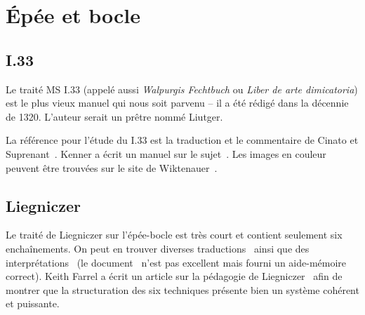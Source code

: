 \chapter{Épée et bocle}

\section{I.33}

Le traité MS I.33 (appelé aussi \emph{Walpurgis Fechtbuch} ou \emph{Liber de arte dimicatoria}) est le plus vieux manuel qui nous soit parvenu – il a été rédigé dans la décennie de 1320.
L'auteur serait un prêtre nommé Liutger.

La référence pour l'étude du I.33 est la traduction et le commentaire de Cinato et Suprenant~\cite{cinato:I33:2009}.
Kenner a écrit un manuel sur le sujet~\cite{kenner:I33:2014}.
Les images en couleur peuvent être trouvées sur le site de Wiktenauer~\cite{wiktenauer:I33}.


\section{Liegniczer}

Le traité de Liegniczer sur l'épée-bocle est très court et contient seulement six enchaînements.
On peut en trouver diverses traductions~\cite{ardamhe:liegniczer, farrell:liegnieczer, lindholm:ringeck_others:2006} ainsi que des interprétations~\cite{youtube:sala_armi:liegniczer, youtube:memag:liegniczer} (le document~\cite[part I]{knight:epee_bocle} n'est pas excellent mais fourni un aide-mémoire correct).
Keith Farrel a écrit un article sur la pédagogie de Liegniczer~\cite{farrell:pedagogy_liegnieczer:2014} afin de montrer que la structuration des six techniques présente bien un système cohérent et puissante.


